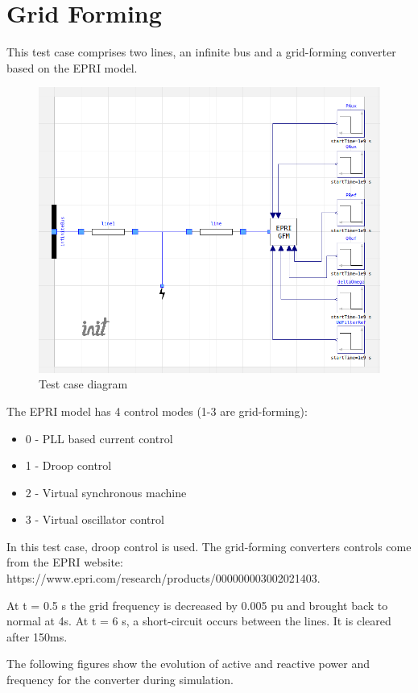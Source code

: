 \documentclass[a4paper, 12pt]{report}
\begin{document}
\newpage

\chapter{Grid Forming}
This test case comprises two lines, an infinite bus and a grid-forming converter based on the EPRI model.

\begin{figure}[H]
  \includegraphics[width=\textwidth]{GFMEPRI.png}
  \caption{Test case diagram}
\end{figure}

The EPRI model has 4 control modes (1-3 are grid-forming):
\begin{itemize}
\item 0 - PLL based current control
\item 1 - Droop control
\item 2 - Virtual synchronous machine
\item 3 - Virtual oscillator control
\end{itemize}

In this test case, droop control is used. The grid-forming converters controls come from the EPRI website: https://www.epri.com/research/products/000000003002021403.

At t = 0.5 s the grid frequency is decreased by 0.005 pu and brought back to normal at 4s. At t = 6 s, a short-circuit occurs between the lines. It is cleared after 150ms.

The following figures show the evolution of active and reactive power and frequency for the converter during simulation.
\end{document}
